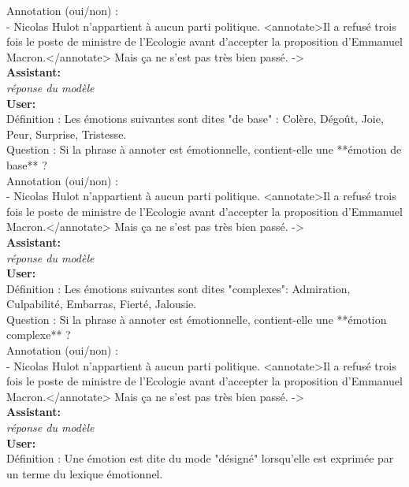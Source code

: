 {Annotation (oui/non) :\\
- Nicolas Hulot n’appartient à aucun parti politique. <annotate>Il a refusé trois fois le poste de ministre de l’Ecologie avant d’accepter la proposition d’Emmanuel Macron.</annotate> Mais ça ne s’est pas très bien passé.  -> \\

\textbf{Assistant:}\\
\textit{réponse du modèle}\\

\textbf{User:}\\
Définition : Les émotions suivantes sont dites "de base" : Colère, Dégoût, Joie, Peur, Surprise, Tristesse.\\

Question : Si la phrase à annoter est émotionnelle, contient-elle une **émotion de base** ?\\

Annotation (oui/non) :\\
- Nicolas Hulot n’appartient à aucun parti politique. <annotate>Il a refusé trois fois le poste de ministre de l’Ecologie avant d’accepter la proposition d’Emmanuel Macron.</annotate> Mais ça ne s’est pas très bien passé.  -> \\

\textbf{Assistant:}\\
\textit{réponse du modèle}\\

\textbf{User:}\\
Définition : Les émotions suivantes sont dites "complexes": Admiration, Culpabilité, Embarras, Fierté, Jalousie.\\

Question : Si la phrase à annoter est émotionnelle, contient-elle une **émotion complexe** ?\\

Annotation (oui/non) :\\
- Nicolas Hulot n’appartient à aucun parti politique. <annotate>Il a refusé trois fois le poste de ministre de l’Ecologie avant d’accepter la proposition d’Emmanuel Macron.</annotate> Mais ça ne s’est pas très bien passé.  -> \\

\textbf{Assistant:}\\
\textit{réponse du modèle}\\

\textbf{User:}\\
Définition : Une émotion est dite du mode "désigné" lorsqu'elle est exprimée par un terme du lexique émotionnel.\\

}
